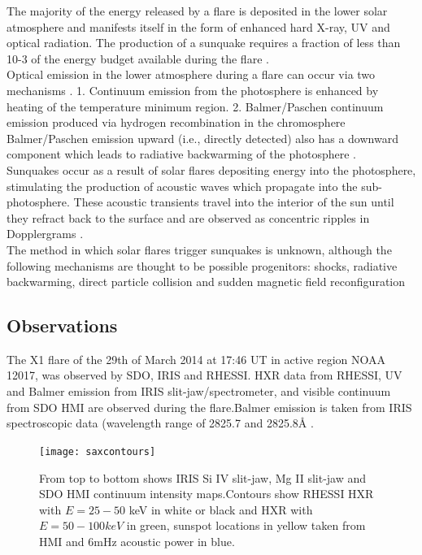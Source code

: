 The majority of the energy released by a flare is deposited in the lower solar atmosphere and manifests itself in the form of enhanced hard X-ray, UV and optical radiation. The production of a sunquake requires a fraction of less than 10-3 of the energy budget available during the flare \citep{2005ApJ...630.1168D}. \\


Optical emission in the lower atmosphere during a flare can occur via two mechanisms \citep{2007ASPC..368..417D}. 
1. Continuum emission from the photosphere is enhanced by heating of the temperature minimum region.
2. Balmer/Paschen continuum emission produced via hydrogen recombination in the chromosphere \\

Balmer/Paschen emission upward (i.e., directly detected) also has a downward component which leads to radiative backwarming of the photosphere \citep{1989SoPh..124..303M}. \\

Sunquakes occur as a result of solar flares depositing energy into the photosphere, stimulating the production of acoustic waves which propagate into the sub-photosphere. These acoustic transients travel into the interior of the sun until they refract back to the surface and are observed as concentric ripples in Dopplergrams \citep{2014arXiv1402.1249K}. \\

The method in which solar flares trigger sunquakes is unknown, although the following mechanisms are thought to be possible progenitors: shocks, radiative backwarming, direct particle collision and sudden magnetic field reconfiguration 



\subsection{Observations}
The X1 flare of the 29th of March 2014 at 17:46 UT in active region NOAA 12017, was observed by SDO, IRIS and RHESSI. HXR data from RHESSI, UV and Balmer emission from IRIS slit-jaw/spectrometer, and visible continuum from SDO HMI are observed during the flare.Balmer emission is taken from IRIS spectroscopic data (wavelength range of 2825.7 and 2825.8Å \citep{2014ApJ...794L..23H}. \\

\begin{figure}\label{saxcontours}
  \begin{center}
  \texttt{[image: saxcontours]}
  \end{center}
  \caption{From top to bottom shows IRIS Si IV slit-jaw, Mg II slit-jaw and SDO HMI continuum intensity maps.Contours show RHESSI HXR with $E = 25-50$ keV in white or black and HXR with $E = 50-100 keV$ in green, sunspot locations in yellow taken from HMI and 6mHz acoustic power in blue.}
\end{figure}



